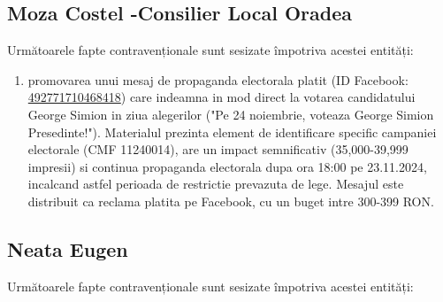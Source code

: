 \documentclass[a4paper,12pt]{article}
\begin{document}
\vspace{0.5cm}

\subsection{Moza Costel -Consilier Local Oradea}
Următoarele fapte contravenționale sunt sesizate împotriva acestei entități:

\begin{enumerate}[leftmargin=*, label=\arabic*.)]
    \item promovarea unui mesaj de propaganda electorala platit (ID Facebook: \href{https://www.facebook.com/ads/library/?id=492771710468418}{492771710468418}) care indeamna in mod direct la votarea candidatului George Simion in ziua alegerilor ("Pe 24 noiembrie, voteaza George Simion Presedinte!"). Materialul prezinta element de identificare specific campaniei electorale (CMF 11240014), are un impact semnificativ (35,000-39,999 impresii) si continua propaganda electorala dupa ora 18:00 pe 23.11.2024, incalcand astfel perioada de restrictie prevazuta de lege. Mesajul este distribuit ca reclama platita pe Facebook, cu un buget intre 300-399 RON.
\end{enumerate}

\vspace{0.5cm}

\subsection{Neata Eugen}
Următoarele fapte contravenționale sunt sesizate împotriva acestei entități:
\end{document}
